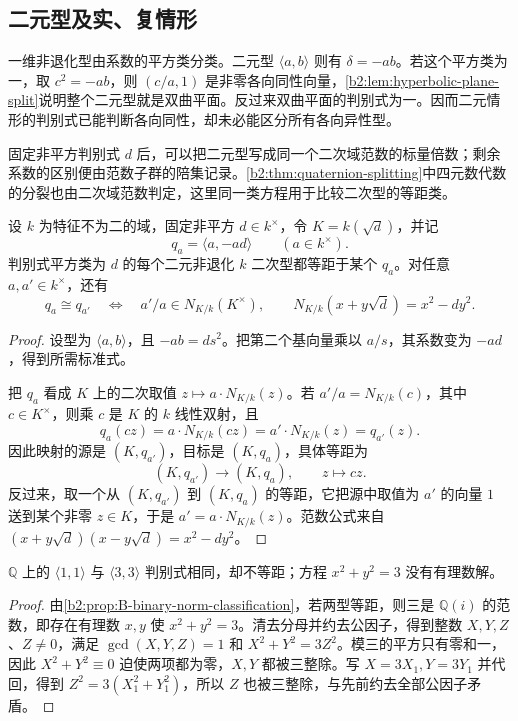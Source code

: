 \subsection{二元型及实、复情形}
\label{b2:subsec:B02:03}

一维非退化型由系数的平方类分类。二元型 \(\langle a,b\rangle\) 则有 \(\delta=-ab\)。若这个平方类为一，取 \(c^2=-ab\)，则 \((c/a,1)\) 是非零各向同性向量，\cref{b2:lem:hyperbolic-plane-split}说明整个二元型就是双曲平面。反过来双曲平面的判别式为一。因而二元情形的判别式已能判断各向同性，却未必能区分所有各向异性型。

\ProseParagraphBreak
固定非平方判别式 \(d\) 后，可以把二元型写成同一个二次域范数的标量倍数；剩余系数的区别便由范数子群的陪集记录。\cref{b2:thm:quaternion-splitting}中四元数代数的分裂也由二次域范数判定，这里同一类方程用于比较二次型的等距类。

\begin{proposition}\label{b2:prop:B-binary-norm-classification}
	设 \(k\) 为特征不为二的域，固定非平方 \(d\in k^\times\)，令 \(K=k(\sqrt d)\)，并记
	\[
		q_a=\langle a,-ad\rangle\qquad(a\in k^\times).
	\]
	判别式平方类为 \(d\) 的每个二元非退化 \(k\) 二次型都等距于某个 \(q_a\)。对任意 \(a,a'\in k^\times\)，还有
	\[
		q_a\cong q_{a'}\quad\Longleftrightarrow\quad a'/a\in N_{K/k}(K^\times), \qquad N_{K/k}(x+y\sqrt d)=x^2-dy^2.
	\]
\end{proposition}
\begin{proof}
	设型为 \(\langle a,b\rangle\)，且 \(-ab=ds^2\)。把第二个基向量乘以 \(a/s\)，其系数变为 \(-ad\)，得到所需标准式。

	把 \(q_a\) 看成 \(K\) 上的二次取值 \(z\mapsto a\cdot N_{K/k}(z)\)。若 \(a'/a=N_{K/k}(c)\)，其中 \(c\in K^\times\)，则乘 \(c\) 是 \(K\) 的 \(k\) 线性双射，且
	\[
		q_a(cz)=a\cdot N_{K/k}(cz)=a'\cdot N_{K/k}(z)=q_{a'}(z).
	\]
	因此映射的源是 \((K,q_{a'})\)，目标是 \((K,q_a)\)，具体等距为
	\[
		(K,q_{a'})\longrightarrow(K,q_a),\qquad z\longmapsto cz.
	\]
	反过来，取一个从 \((K,q_{a'})\) 到 \((K,q_a)\) 的等距，它把源中取值为 \(a'\) 的向量 \(1\) 送到某个非零 \(z\in K\)，于是 \(a'=a\cdot N_{K/k}(z)\)。范数公式来自 \((x+y\sqrt d)(x-y\sqrt d)=x^2-dy^2\)。
\end{proof}

\begin{example}\label{b2:exm:B-rational-norm-obstruction}
	\(\mathbb Q\) 上的 \(\langle1,1\rangle\) 与 \(\langle3,3\rangle\) 判别式相同，却不等距；方程 \(x^2+y^2=3\) 没有有理数解。
\end{example}
\begin{proof}
	由\cref{b2:prop:B-binary-norm-classification}，若两型等距，则三是 \(\mathbb Q(i)\) 的范数，即存在有理数 \(x,y\) 使 \(x^2+y^2=3\)。清去分母并约去公因子，得到整数 \(X,Y,Z\)、\(Z\ne0\)，满足 \(\gcd(X,Y,Z)=1\) 和 \(X^2+Y^2=3Z^2\)。模三的平方只有零和一，因此 \(X^2+Y^2\equiv0\) 迫使两项都为零，\(X,Y\) 都被三整除。写 \(X=3X_1,Y=3Y_1\) 并代回，得到 \(Z^2=3(X_1^2+Y_1^2)\)，所以 \(Z\) 也被三整除，与先前约去全部公因子矛盾。
\end{proof}

